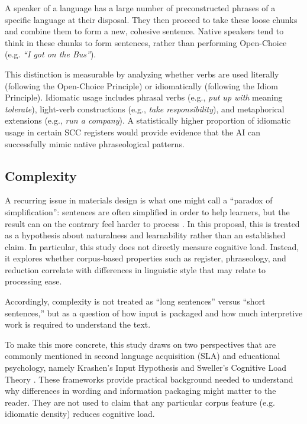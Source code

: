 A speaker of a language has a large number of preconstructed phrases of a specific language at their disposal. They then proceed to take these loose chunks and combine them to form a new, cohesive sentence. Native speakers tend to think in these chunks to form sentences, rather than performing Open-Choice (e.g. \textit{``I got on the Bus''}).

This distinction is measurable by analyzing whether verbs are used literally (following the Open-Choice Principle) or idiomatically (following the Idiom Principle). Idiomatic usage includes phrasal verbs (e.g., \textit{put up with} meaning \textit{tolerate}), light-verb constructions (e.g., \textit{take responsibility}), and metaphorical extensions (e.g., \textit{run a company}). A statistically higher proportion of idiomatic usage in certain SCC registers would provide evidence that the AI can successfully mimic native phraseological patterns.

\subsection{Complexity}

A recurring issue in materials design is what one might call a ``paradox of simplification'': sentences are often simplified in order to help learners, but the result can on the contrary feel harder to process \parencite{spiroCognitiveFlexibility1992}. In this proposal, this is treated as a hypothesis about naturalness and learnability rather than an established claim. In particular, this study does not directly measure cognitive load. Instead, it explores whether corpus-based properties such as register, phraseology, and reduction correlate with differences in linguistic style that may relate to processing ease.

Accordingly, complexity is not treated as ``long sentences'' versus ``short sentences,'' but as a question of how input is packaged and how much interpretive work is required to understand the text.

To make this more concrete, this study draws on two perspectives that are commonly mentioned in second language acquisition (SLA) and educational psychology, namely Krashen's Input Hypothesis \parencite{krashenInputHypothesisIssues1985} and Sweller's Cognitive Load Theory \parencite{swellerCognitiveLoadProblem1988a}. These frameworks provide practical background needed to understand why differences in wording and information packaging might matter to the reader. They are not used to claim that any particular corpus feature (e.g. idiomatic density) reduces cognitive load.

